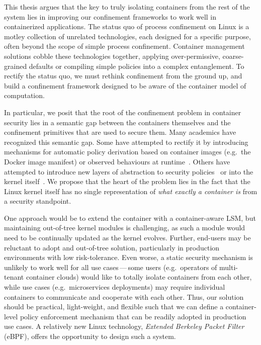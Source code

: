 This thesis argues that the key to truly isolating containers from the rest of the system
lies in improving our confinement frameworks to work well in containerized applications.
The status quo of process confinement on Linux is a motley collection of unrelated
technologies, each designed for a specific purpose, often beyond the scope of simple
process confinement. Container management solutions cobble these technologies together,
applying over-permissive, coarse-grained defaults or compiling simple policies into
a complex entanglement. To rectify the status quo, we must rethink confinement from the
ground up, and build a confinement framework designed to be aware of the container model
of computation.

In particular, we posit that the root of the confinement problem in container security
lies in a semantic gap between the containers themselves and the confinement primitives
that are used to secure them. Many academics have recognized this semantic gap. Some have
attempted to rectify it by introducing mechanisms for automatic policy derivation based on
container images (e.g.~the Docker image manifest) or observed behaviours at
runtime~. Others have attempted to introduce new layers of
abstraction to security policies~ or into the kernel
itself~.  We
propose that the heart of the problem lies in the fact that the Linux kernel itself has no
single representation of \textit{what exactly a container is} from a security standpoint.

One approach would be to extend the container with a container-aware LSM, but maintaining
out-of-tree kernel modules is challenging, as such a module would need to be continually
updated as the kernel evolves. Further, end-users may be reluctant to adopt and
out-of-tree solution, particularly in production environments with low risk-tolerance.
Even worse, a static security mechanism is unlikely to work well for all use
cases\,---\,some users (e.g.~operators of multi-tenant container clouds) would like to
totally isolate containers from each other, while use cases (e.g.~microservices
deployments) may require individual containers to communicate and cooperate with each
other. Thus, our solution should be practical, light-weight, and flexible such that we can
define a container-level policy enforcement mechanism that can be readily adopted in
production use cases. A relatively new Linux technology, \textit{Extended Berkeley Packet
Filter} (eBPF), offers the opportunity to design such a system.

